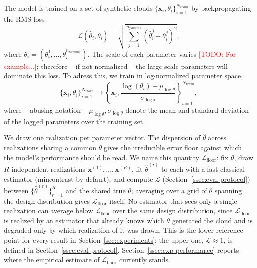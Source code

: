 \documentclass[11pt,letterpaper]{article}
\newcommand{\1}{\mathds{1}}
\newcommand{\pc}{\mathbf{x}}
\newcommand{\todo}[1]{\textcolor{red}{[TODO: #1]}}
\newcommand{\fix}[1]{\textcolor{blue}{[FIX: #1]}}
\newcommand{\todo}[1]{}\newcommand{\fix}[1]{}
\theoremstyle{plain}
\theoremstyle{definitioncolon}
\begin{document}
The model is trained on a set of synthetic clouds
$\{\pc_i, \theta_i\}_{i=1}^{N_{train}}$ by backpropagating the RMS loss
    \[
    \mathcal{L}(\hat\theta_i, \theta_i) = \sqrt{\sum_{j=1}^{n_{params}}(\hat\theta^j_i - \theta^j_i)^2},
    \]
where $\theta_i = (\theta_i^1, \dots, \theta_i^{n_{params}})$. The scale of each
parameter varies \todo{For example...}; therefore -- if not normalized -- the 
large-scale parameters will
dominate this loss. To adress this, we train in log-normalized parameter space,
    \[
    \{\pc_i, \theta_i\}_{i=1}^{N_{train}} \rightarrow
    \left\{\pc_i, \frac{\log(\theta_i) - \mu_{\log\theta}}
    {\sigma_{\log\theta}}\right\}_{i=1}^{N_{train}},
    \]
where -- abusing notation -- $\mu_{\log\theta}, \sigma_{\log\theta}$ denote the
mean and standard deviation of the logged parameters over the training set.

We draw one realization per parameter vector. The dispersion of $\hat\theta$
across realizations sharing a common $\theta$ gives the irreducible error floor
against which the model's performance should be read. We name this quantity
$\mathcal{L}_{\text{floor}}$: fix $\theta$, draw $R$ independent realizations
$\pc^{(1)}, \dots, \pc^{(R)}$, fit $\hat\theta^{(r)}$ to each with a fast
classical estimator (mincontrast by default), and compute $\mathcal{L}$
(Section~\ref{ssec:eval-protocol}) between $\{\hat\theta^{(r)}\}_{r=1}^R$ and
the shared true $\theta$; averaging over a grid of $\theta$ spanning the
design distribution gives $\mathcal{L}_{\text{floor}}$ itself. No estimator
that sees only a single realization can average below
$\mathcal{L}_{\text{floor}}$ over the same design distribution, since
$\mathcal{L}_{\text{floor}}$ is realized by an estimator that already knows
which $\theta$ generated the cloud and is degraded only by which realization
of it was drawn. This is the lower reference point for every result in
Section~\ref{sec:experiments}; the upper one, $\mathcal{L}\approx1$, is
defined in Section~\ref{ssec:eval-protocol}. Section~\ref{ssec:exp-performance}
reports where the empirical estimate of $\mathcal{L}_{\text{floor}}$
currently stands.

\end{document}
